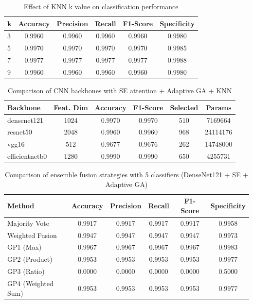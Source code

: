 \documentclass{article}
\begin{document}
\begin{table}[htbp]
\centering
\caption{Effect of KNN k value on classification performance}
\label{tab:table13}
\begin{tabular}{lccccc}
\toprule
k & Accuracy & Precision & Recall & F1-Score & Specificity \\
\midrule
3 & 0.9960 & 0.9960 & 0.9960 & 0.9960 & 0.9980 \\
5 & 0.9970 & 0.9970 & 0.9970 & 0.9970 & 0.9985 \\
7 & 0.9977 & 0.9977 & 0.9977 & 0.9977 & 0.9988 \\
9 & 0.9960 & 0.9960 & 0.9960 & 0.9960 & 0.9980 \\
\bottomrule
\end{tabular}
\end{table}

\begin{table}[htbp]
\centering
\caption{Comparison of CNN backbones with SE attention + Adaptive GA + KNN}
\label{tab:table14}
\begin{tabular}{lccccc}
\toprule
Backbone & Feat. Dim & Accuracy & F1-Score & Selected & Params \\
\midrule
densenet121 & 1024 & 0.9970 & 0.9970 & 510 & 7169664 \\
resnet50 & 2048 & 0.9960 & 0.9960 & 968 & 24114176 \\
vgg16 & 512 & 0.9677 & 0.9676 & 262 & 14748000 \\
efficientnetb0 & 1280 & 0.9990 & 0.9990 & 650 & 4255731 \\
\bottomrule
\end{tabular}
\end{table}

\begin{table}[htbp]
\centering
\caption{Comparison of ensemble fusion strategies with 5 classifiers (DenseNet121 + SE + Adaptive GA)}
\label{tab:table15}
\begin{tabular}{lccccc}
\toprule
Method & Accuracy & Precision & Recall & F1-Score & Specificity \\
\midrule
Majority Vote & 0.9917 & 0.9917 & 0.9917 & 0.9917 & 0.9958 \\
Weighted Fusion & 0.9947 & 0.9947 & 0.9947 & 0.9947 & 0.9973 \\
GP1 (Max) & 0.9967 & 0.9967 & 0.9967 & 0.9967 & 0.9983 \\
GP2 (Product) & 0.9953 & 0.9953 & 0.9953 & 0.9953 & 0.9977 \\
GP3 (Ratio) & 0.0000 & 0.0000 & 0.0000 & 0.0000 & 0.5000 \\
GP4 (Weighted Sum) & 0.9953 & 0.9953 & 0.9953 & 0.9953 & 0.9977 \\
\bottomrule
\end{tabular}
\end{table}
\end{document}
